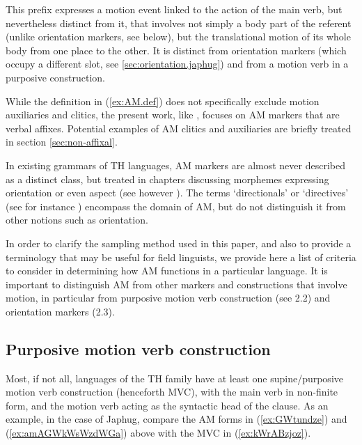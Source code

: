 \documentclass[oneside,a4paper,11pt]{article}
\begin{document}
This prefix expresses a motion event linked to the action of the main verb, but nevertheless distinct from it, that involves not simply a body part of the referent (unlike orientation markers, see below), but the translational motion of its whole body from one place to the other. It is distinct from orientation markers (which occupy a different slot, see \ref{sec:orientation.japhug}) and from a motion verb in a purposive construction.

While the definition in (\ref{ex:AM.def}) does not specifically exclude motion auxiliaries and clitics, the present work, like \citet[19-20]{guillaume16am}, focuses on AM markers that are verbal affixes. Potential examples of AM clitics and auxiliaries are briefly treated in section \ref{sec:non-affixal}.


In existing grammars of TH languages, AM markers are almost never described as a distinct class, but treated in chapters discussing morphemes expressing orientation or even aspect (see however \citealt{king09dhimal}). The terms `directionals' or `directives' (see for instance \citealt{delancey85analysis}) encompass the domain of AM, but do not distinguish it from other notions such as orientation.

In order to clarify the sampling method used in this paper, and also to provide a terminology that may be useful for field linguists, we provide here a list of criteria to consider in determining how AM functions in a particular language.  It is important to distinguish AM from other markers and constructions that involve motion, in particular from purposive motion verb construction (see 2.2) and orientation markers (2.3).

\subsection{Purposive motion verb construction}
Most, if not all, languages of the TH family have at least one supine/purposive motion verb construction (henceforth MVC), with the main verb in non-finite form, and the motion verb acting as the syntactic head of the clause. As an example, in the case of Japhug, compare the AM forms in  (\ref{ex:GWtundze})  and (\ref{ex:amAGWkWsWzdWGa}) above with the MVC in (\ref{ex:kWrABzjoz}). 
\end{document}

